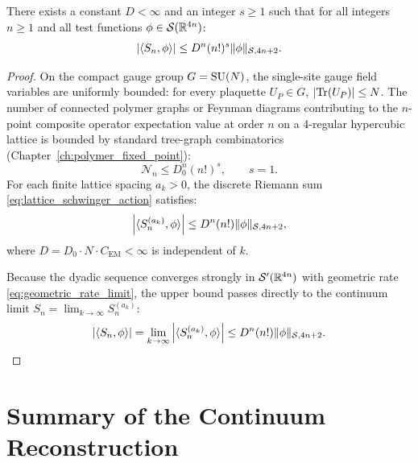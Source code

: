 \begin{proposition}
\label{prop:os4}
There exists a constant $D < \infty$ and an integer $s \ge 1$ such that for all integers $n \ge 1$ and all test functions $\phi \in \mathcal{S}(\mathbb{R}^{4n})$:
\begin{equation}
\label{eq:os4_factorial_growth}
\left| \langle S_n, \phi \rangle \right| \le D^n (n!)^s \|\phi\|_{\mathcal{S}, 4n+2}.
\end{equation}
\end{proposition}

\begin{proof}
On the compact gauge group $G = \mathrm{SU}(N)$, the single-site gauge field variables are uniformly bounded: for every plaquette $U_P \in G$, $|\mathrm{Tr}(U_P)| \le N$. The number of connected polymer graphs or Feynman diagrams contributing to the $n$-point composite operator expectation value at order $n$ on a 4-regular hypercubic lattice is bounded by standard tree-graph combinatorics (Chapter~\ref{ch:polymer_fixed_point}):
\begin{equation}
\mathcal{N}_n \le D_0^n (n!)^s, \qquad s = 1.
\end{equation}
For each finite lattice spacing $a_k > 0$, the discrete Riemann sum \eqref{eq:lattice_schwinger_action} satisfies:
\begin{equation}
\left| \langle S_n^{(a_k)}, \phi \rangle \right| \le D^n (n!) \|\phi\|_{\mathcal{S}, 4n+2},
\end{equation}
where $D = D_0 \cdot N \cdot C_{\mathrm{EM}} < \infty$ is independent of $k$.

Because the dyadic sequence converges strongly in $\mathcal{S}'(\mathbb{R}^{4n})$ with geometric rate \eqref{eq:geometric_rate_limit}, the upper bound passes directly to the continuum limit $S_n = \lim_{k \to \infty} S_n^{(a_k)}$:
\begin{equation}
\left| \langle S_n, \phi \rangle \right| = \lim_{k \to \infty} \left| \langle S_n^{(a_k)}, \phi \rangle \right| \le D^n (n!) \|\phi\|_{\mathcal{S}, 4n+2}. \qedhere
\end{equation}
\end{proof}

\section{Summary of the Continuum Reconstruction}
\label{sec:ch16_summary}

